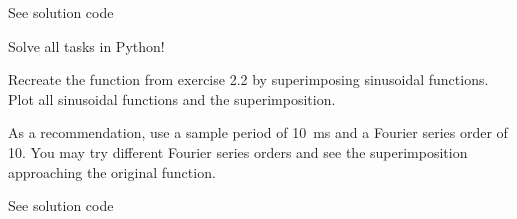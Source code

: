 \begin{solution}
	See solution code
\end{solution}

\begin{question}[subtitle={Python Programming: Fourier Series}]
	Solve all tasks in Python!
	
	Recreate the function from exercise 2.2 by superimposing sinusoidal functions. Plot all sinusoidal functions and the superimposition.
	
	As a recommendation, use a sample period of \SI{10}{ms} and a Fourier series order of 10. You may try different Fourier series orders and see the superimposition approaching the original function.
\end{question}

\begin{solution}
	See solution code
\end{solution}
